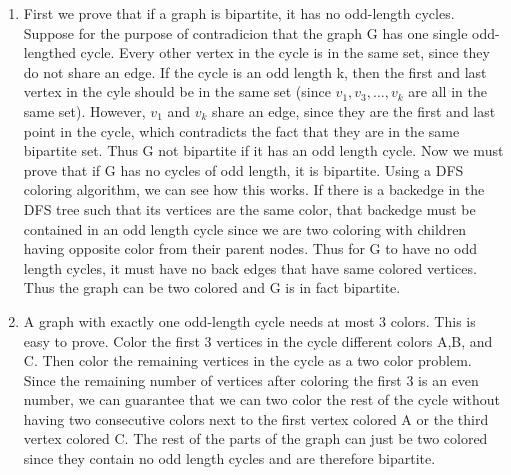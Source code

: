 \documentclass[11pt]{article}
\newenvironment{qparts}{\begin{enumerate}[{(}a{)}]}{\end{enumerate}}
\begin{document}
\begin{qparts}
\item First we prove that if a graph is bipartite, it has no odd-length cycles. Suppose for the purpose of contradicion that the graph G has one single odd-lengthed cycle. Every other vertex in the cycle is in the same set, since they do not share an edge. If the cycle is an odd length k, then the first and last vertex in the cyle should be in the same set (since $v_1,v_3,...,v_k$ are all in the same set). However, $v_1$ and $v_k$ share an edge, since they are the first and last point in the cycle, which contradicts the fact that they are in the same bipartite set. Thus G not bipartite if it has an odd length cycle.
Now we must prove that if G has no cycles of odd length, it is bipartite. Using a DFS coloring algorithm, we can see how this works. If there is a backedge in the DFS tree such that its vertices are the same color, that backedge must be contained in an odd length cycle since we are two coloring with children having opposite color from their parent nodes. Thus for G to have no odd length cycles, it must have no back edges that have same colored vertices. Thus the graph can be two colored and G is in fact bipartite.
\item A graph with exactly one odd-length cycle needs at most 3 colors. This is easy to prove. Color the first 3 vertices in the cycle different colors A,B, and C. Then color the remaining vertices in the cycle as a two color problem. Since the remaining number of vertices after coloring the first 3 is an even number,  we can guarantee that we can two color the rest of the cycle without having two consecutive colors next to the first vertex colored A or the third vertex colored C. The rest of the parts of the graph can just be two colored since they contain no odd length cycles and are therefore bipartite. 
\end{qparts}

\newpage
\end{document}
